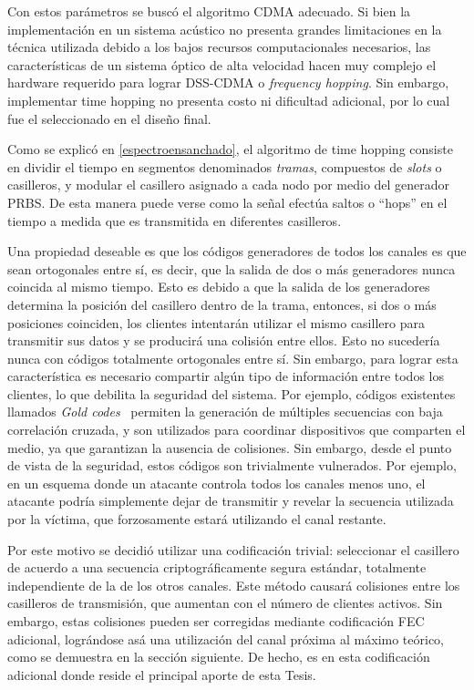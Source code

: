 Con estos parámetros se buscó el algoritmo CDMA adecuado. Si bien la implementación en un sistema acústico no presenta grandes limitaciones en la técnica utilizada debido a los bajos recursos computacionales necesarios, las características de un sistema óptico de alta velocidad hacen muy complejo el hardware requerido para lograr DSS-CDMA o \textit{frequency hopping}. Sin embargo, implementar time hopping no presenta costo ni dificultad adicional, por lo cual fue el seleccionado en el diseño final.

Como se explicó en \ref{espectroensanchado}, el algoritmo de time hopping consiste en dividir el tiempo en segmentos denominados \textit{tramas}, compuestos de \textit{slots} o casilleros, y modular el casillero asignado a cada nodo por medio del generador PRBS. De esta manera puede verse como la señal efectúa saltos o ``hops'' en el tiempo a medida que es transmitida en diferentes casilleros.


Una propiedad deseable es que los códigos generadores de todos los canales es que sean ortogonales entre sí, es decir, que la salida de dos o más generadores nunca coincida al mismo tiempo. Esto es debido a que la salida de los generadores determina la posición del casillero dentro de la trama, entonces, si dos o más posiciones coinciden, los clientes intentarán utilizar el mismo casillero para transmitir sus datos y se producirá una colisión entre ellos. Esto no sucedería nunca con códigos totalmente ortogonales entre sí. Sin embargo, para lograr esta característica es necesario compartir algún tipo de información entre todos los clientes, lo que debilita la seguridad del sistema. Por ejemplo, códigos existentes llamados \textit{Gold codes}~\cite{gold1967optimal} permiten la generación de múltiples secuencias con baja correlación cruzada, y son utilizados para coordinar dispositivos que comparten el medio, ya que garantizan la ausencia de colisiones. Sin embargo, desde el punto de vista de la seguridad, estos códigos son trivialmente vulnerados. Por ejemplo, en un esquema donde un atacante controla todos los canales menos uno, el atacante podría simplemente dejar de transmitir y revelar la secuencia utilizada por la víctima, que forzosamente estará utilizando el canal restante.

Por este motivo se decidió utilizar una codificación trivial: seleccionar el casillero de acuerdo a una secuencia criptográficamente segura estándar, totalmente independiente de la de los otros canales. Este método causará colisiones entre los casilleros de transmisión, que aumentan con el número de clientes activos. Sin embargo, estas colisiones pueden ser corregidas mediante codificación FEC adicional, lográndose asá una utilización del canal próxima al máximo teórico, como se demuestra en la sección siguiente. De hecho, es en esta codificación adicional donde reside el principal aporte de esta Tesis.

